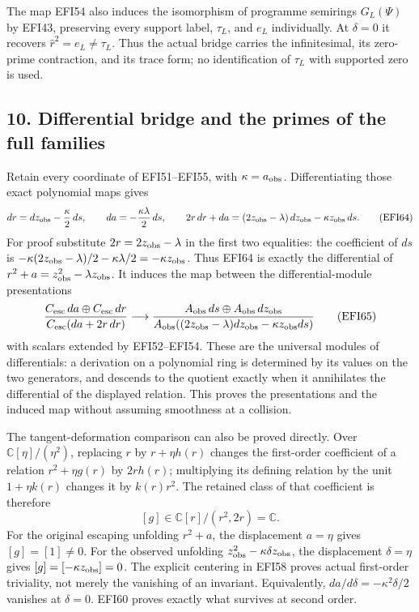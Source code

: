 \documentclass[
  10pt,
  a4paper,
]{article}
\begin{document}
The map EFI54 also induces the isomorphism of programme semirings
\(G_L(\Psi)\) by EFI43, preserving every support label, \(\tau_L\), and
\(e_L\) individually. At \(\delta=0\) it recovers
\(\widehat r^2=e_L\ne\tau_L\). Thus the actual bridge carries the
infinitesimal, its zero-prime contraction, and its trace form; no
identification of \(\tau_L\) with supported zero is used.

\subsection{10. Differential bridge and the primes of the full
families}\label{differential-bridge-and-the-primes-of-the-full-families}

Retain every coordinate of EFI51--EFI55, with \(\kappa=a_{\rm obs}\).
Differentiating those exact polynomial maps gives \[
dr=dz_{\rm obs}-\frac\kappa2\,ds,\qquad
da=-\frac{\kappa\lambda}{2}\,ds,\qquad
2r\,dr+da=(2z_{\rm obs}-\lambda)\,dz_{\rm obs}
-\kappa z_{\rm obs}\,ds.
\tag{EFI64}
\] For proof substitute \(2r=2z_{\rm obs}-\lambda\) in the first two
equalities: the coefficient of \(ds\) is
\(-\kappa(2z_{\rm obs}-\lambda)/2-\kappa\lambda/2
=-\kappa z_{\rm obs}\). Thus EFI64 is exactly the differential of
\(r^2+a=z_{\rm obs}^2-\lambda z_{\rm obs}\). It induces the map between
the differential-module presentations \[
\frac{C_{\rm esc}\,da\oplus C_{\rm esc}\,dr}
     {C_{\rm esc}(da+2r\,dr)}
\longrightarrow
\frac{A_{\rm obs}\,ds\oplus A_{\rm obs}\,dz_{\rm obs}}
     {A_{\rm obs}((2z_{\rm obs}-\lambda)dz_{\rm obs}
                    -\kappa z_{\rm obs}ds)}
\tag{EFI65}
\] with scalars extended by EFI52--EFI54. These are the universal
modules of differentials: a derivation on a polynomial ring is
determined by its values on the two generators, and descends to the
quotient exactly when it annihilates the differential of the displayed
relation. This proves the presentations and the induced map without
assuming smoothness at a collision.

The tangent-deformation comparison can also be proved directly. Over
\(\mathbb C[\eta]/(\eta^2)\), replacing \(r\) by \(r+\eta h(r)\) changes
the first-order coefficient of a relation \(r^2+\eta g(r)\) by
\(2rh(r)\); multiplying its defining relation by the unit
\(1+\eta k(r)\) changes it by \(k(r)r^2\). The retained class of that
coefficient is therefore \[
[g]\in\mathbb C[r]/(r^2,2r)=\mathbb C.
\tag{EFI66}
\] For the original escaping unfolding \(r^2+a\), the displacement
\(a=\eta\) gives \([g]=[1]\ne0\). For the observed unfolding
\(z_{\rm obs}^2-\kappa\delta z_{\rm obs}\), the displacement
\(\delta=\eta\) gives \([g]=[-\kappa z_{\rm obs}]=0\). The explicit
centering in EFI58 proves actual first-order triviality, not merely the
vanishing of an invariant. Equivalently,
\(da/d\delta=-\kappa^2\delta/2\) vanishes at \(\delta=0\). EFI60 proves
exactly what survives at second order.
\end{document}
